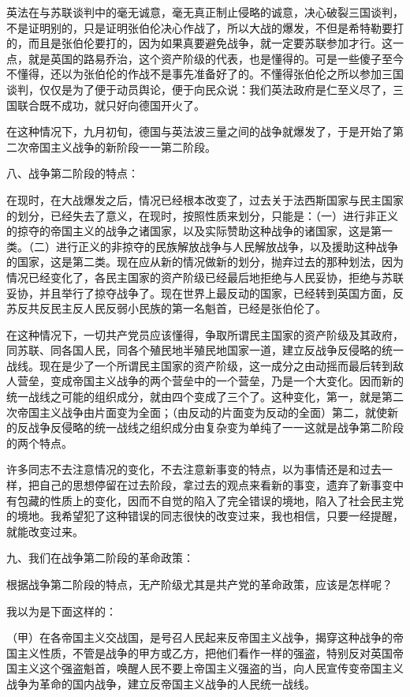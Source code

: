 英法在与苏联谈判中的毫无诚意，毫无真正制止侵略的诚意，决心破裂三国谈判，不是证明别的，只是证明张伯伦决心作战了，所以大战的爆发，不但是希特勒要打的，而且是张伯伦要打的，因为如果真要避免战争，就一定要苏联参加才行。这一点，就是英国的路易乔治，这个资产阶级的代表，也是懂得的。可是一些傻子至今不懂得，还以为张伯伦的作战不是事先准备好了的。不懂得张伯伦之所以参加三国谈判，仅仅是为了便于动员舆论，便于向民众说：我们英法政府是仁至义尽了，三国联合既不成功，就只好向德国开火了。

在这种情况下，九月初旬，德国与英法波三量之间的战争就爆发了，于是开始了第二次帝国主义战争的新阶段一一第二阶段。

八、战争第二阶段的特点：

在现时，在大战爆发之后，情况已经根本改变了，过去关于法西斯国家与民主国家的划分，已经失去了意义，在现时，按照性质来划分，只能是：（一）进行非正义的掠夺的帝国主义的战争之诸国家，以及实际赞助这种战争的诸国家，这是第一类。（二）进行正义的非掠夺的民族解放战争与人民解放战争，以及援助这种战争的国家，这是第二类。现在应从新的情况做新的划分，抛弃过去的那种划法，因为情况已经变化了，各民主国家的资产阶级已经最后地拒绝与人民妥协，拒绝与苏联妥协，并且举行了掠夺战争了。现在世界上最反动的国家，已经转到英国方面，反苏反共反民主反人民反弱小民族的第一名魁首，已经是张伯伦了。

在这种情况下，一切共产党员应该懂得，争取所谓民主国家的资产阶级及其政府，同苏联、同各国人民，同各个殖民地半殖民地国家一道，建立反战争反侵略的统一战线。现在是少了一个所谓民主国家的资产阶级，这一成分之由动摇而最后转到敌人营垒，变成帝国主义战争的两个营垒中的一个营垒，乃是一个大变化。因而新的统一战线之可能的组织成分，就由四个变成了三个了。这种变化，第一，就是第二次帝国主义战争由片面变为全面；（由反动的片面变为反动的全面）第二，就使新的反战争反侵略的统一战线之组织成分由复杂变为单纯了一一这就是战争第二阶段的两个特点。

许多同志不去注意情况的变化，不去注意新事变的特点，以为事情还是和过去一样，把自己的思想停留在过去阶段，拿过去的观点来看新的事变，遗弃了新事变中有包藏的性质上的变化，因而不自觉的陷入了完全错误的境地，陷入了社会民主党的境地。我希望犯了这种错误的同志很快的改变过来，我也相信，只要一经提醒，就能改变过来。

九、我们在战争第二阶段的革命政策：

根据战争第二阶段的特点，无产阶级尤其是共产党的革命政策，应该是怎样呢？

我以为是下面这样的：

（甲）在各帝国主义交战国，是号召人民起来反帝国主义战争，揭穿这种战争的帝国主义性质，不管是战争的甲方或乙方，把他们看作一样的强盗，特别反对英国帝国主义这个强盗魁首，唤醒人民不要上帝国主义强盗的当，向人民宣传变帝国主义战争为革命的国内战争，建立反帝国主义战争的人民统一战线。

